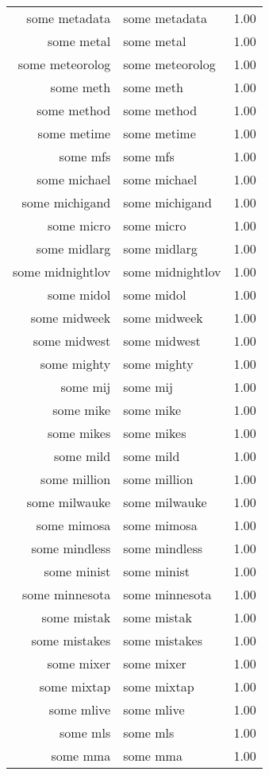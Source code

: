 \begin{table}[ht]
\begin{tabular}{rlr}
  some metadata & some metadata & 1.00 \\ 
  some metal & some metal & 1.00 \\ 
  some meteorolog & some meteorolog & 1.00 \\ 
  some meth & some meth & 1.00 \\ 
  some method & some method & 1.00 \\ 
  some metime & some metime & 1.00 \\ 
  some mfs & some mfs & 1.00 \\ 
  some michael & some michael & 1.00 \\ 
  some michigand & some michigand & 1.00 \\ 
  some micro & some micro & 1.00 \\ 
  some midlarg & some midlarg & 1.00 \\ 
  some midnightlov & some midnightlov & 1.00 \\ 
  some midol & some midol & 1.00 \\ 
  some midweek & some midweek & 1.00 \\ 
  some midwest & some midwest & 1.00 \\ 
  some mighty & some mighty & 1.00 \\ 
  some mij & some mij & 1.00 \\ 
  some mike & some mike & 1.00 \\ 
  some mikes & some mikes & 1.00 \\ 
  some mild & some mild & 1.00 \\ 
  some million & some million & 1.00 \\ 
  some milwauke & some milwauke & 1.00 \\ 
  some mimosa & some mimosa & 1.00 \\ 
  some mindless & some mindless & 1.00 \\ 
  some minist & some minist & 1.00 \\ 
  some minnesota & some minnesota & 1.00 \\ 
  some mistak & some mistak & 1.00 \\ 
  some mistakes & some mistakes & 1.00 \\ 
  some mixer & some mixer & 1.00 \\ 
  some mixtap & some mixtap & 1.00 \\ 
  some mlive & some mlive & 1.00 \\ 
  some mls & some mls & 1.00 \\ 
  some mma & some mma & 1.00 \\ 

\end{tabular}
\end{table}
